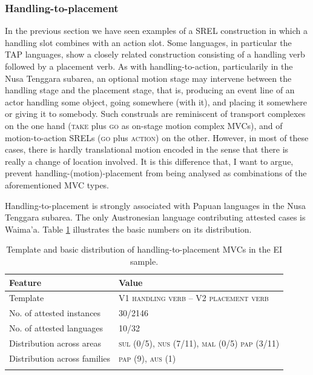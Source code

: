 \subsubsection{Handling-to-placement} \label{sec:handling-to-placement}
In the previous section we have seen examples of a SREL construction in which a handling slot combines with an action slot. Some languages, in particular the \textsc{TAP} languages, show a closely related construction consisting of a handling verb followed by a placement verb. As with handling-to-action, particularily in the Nusa Tenggara subarea, an optional motion stage may intervene between the handling stage and the placement stage, that is, producing an event line of an actor handling some object, going somewhere (with it), and placing it somewhere or giving it to somebody. Such construals are reminiscent of transport complexes on the one hand (\textsc{take} plus \textsc{go} as on-stage motion complex MVCs), and of motion-to-action SRELs (\textsc{go} plus \textsc{action}) on the other. However, in most of these cases, there is hardly translational motion encoded in the sense that there is really a change of location involved. It is this difference that, I want to argue, prevent handling-(motion)-placement from being analysed as combinations of the aforementioned MVC types.

Handling-to-placement is strongly associated with Papuan languages in the Nusa Tenggara subarea. The only Austronesian language contributing attested cases is Waima'a. Table \ref{table:handling-to-placement} illustrates the basic numbers on its distribution.

\begin{table}
\begin{tabular}{ll}
\lsptoprule
Feature&Value\tabularnewline
\midrule
Template&V1 \textsc{handling verb} -- V2 \textsc{placement verb}\tabularnewline
No. of attested instances& 30/2146 \tabularnewline
No. of attested languages& 10/32 \tabularnewline
Distribution across areas& \textsc{sul} (0/5), \textsc{nus} (7/11), \textsc{mal} (0/5) \textsc{pap} (3/11) \tabularnewline
Distribution across families& \textsc{pap} (9), \textsc{aus} (1) \tabularnewline
\lspbottomrule
\end{tabular}
\caption[Template and basic distribution of handling-to-placement MVCs]{Template and basic distribution of handling-to-placement MVCs in the EI sample.}
\label{table:handling-to-placement}
\end{table}

